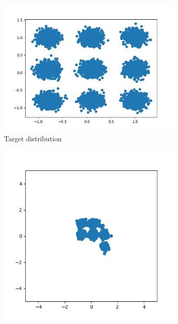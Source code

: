 \begin{figure}[htbp]
    \centering
    \begin{subfigure}{0.32\textwidth}
        \includegraphics[width=\linewidth]{gfx/Real Data.png}
        \caption{Target distribution}
        \label{fig:target_samples}
    \end{subfigure}
    \hfill 
    \begin{subfigure}{0.32\textwidth}
        \includegraphics[width=\linewidth]{gfx/rl_before_train.png}

\end{subfigure}
\end{figure}

